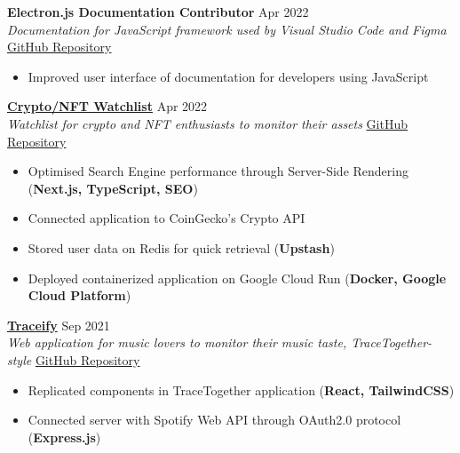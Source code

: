 \documentclass[a4paper]{article}
\begin{document}
\textbf{Electron.js Documentation Contributor} \hfill Apr 2022\\
\textit{Documentation for JavaScript framework used by Visual Studio Code and Figma} \hfill \href{https://github.com/electron/electronjs.org-new/pull/211}{GitHub Repository}\\
\vspace{-2mm}
\begin{itemize} \itemsep 1pt
    \item Improved user interface of documentation for developers using JavaScript
\end{itemize}

\textbf{\href{https://crypto-docker-nypoewfveq-uc.a.run.app/}{Crypto/NFT Watchlist}} \hfill Apr 2022\\
\textit{Watchlist for crypto and NFT enthusiasts to monitor their assets} \hfill \href{https://github.com/jianrong7/crypto-ts}{GitHub Repository}\\
\vspace{-2mm}
\begin{itemize} \itemsep 1pt
    \item Optimised Search Engine performance through Server-Side Rendering (\textbf{Next.js, TypeScript, SEO})
    \item Connected application to CoinGecko's Crypto API
    \item Stored user data on Redis for quick retrieval (\textbf{Upstash})
    \item Deployed containerized application on Google Cloud Run (\textbf{Docker, Google Cloud Platform})
\end{itemize}

\textbf{\href{https://traceify-client.netlify.app/}{Traceify}} \hfill Sep 2021\\
\textit{Web application for music lovers to monitor their music taste, TraceTogether-style} \hfill \href{https://github.com/jianrong7/traceify-client}{GitHub Repository}\\
\vspace{-2mm}
\begin{itemize} \itemsep 1pt
    \item Replicated components in TraceTogether application (\textbf{React, TailwindCSS})
    \item Connected server with Spotify Web API through OAuth2.0 protocol (\textbf{Express.js})
\end{itemize}
\end{document}
